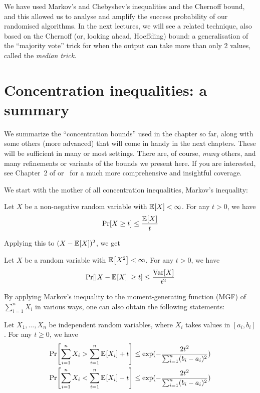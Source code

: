 \begin{framed}
 We have used Markov's and Chebyshev's inequalities and the Chernoff bound, and this allowed us to analyse and amplify the success probability of our randomised algorithms. In the next lectures, we will see a related technique, also based on the Chernoff (or, looking ahead, Hoeffding) bound: a generalisation of the ``majority vote'' trick for when the output can take more than only 2 values, called the \emph{median trick.}
\end{framed}


\section{Concentration inequalities: a summary}
We summarize the ``concentration bounds'' used in the chapter so far, along with some others (more advanced) that will come in handy in the next chapters. These will be sufficient in many or most settings. 
There are, of course, \emph{many} others, and many refinements or variants of the bounds we present here. If you are interested, see \eg Chapter~2 of \cite{Vershynin18} or~\cite{BoucheronLM13} for a much more comprehensive and insightful coverage.

We start with the mother of all concentration inequalities, Markov's inequality:
\begin{theorem}
  \label{theo:markov}
Let $X$ be a non-negative random variable with $\bEE{X} < \infty$. For any $t > 0$, we have
\[  
  \bPr{ X \geq t } \leq \frac{\bEE{X}}{t}
\]
\end{theorem}
\noindent Applying this to $(X-\bEE{X})^2$, we get 
\begin{theorem}
  \label{theo:chebyshev}
Let $X$ be a random variable with $\bEE{X^2} < \infty$. For any $t > 0$, we have
\[  
  \bPr{ \abs{X-\bEE{X}} \geq t } \leq \frac{\var[X]}{t^2}
\]
\end{theorem}
By applying Markov's inequality to the moment-generating function (MGF) of $\sum_{i=1}^n X_i$ in various ways, one can also obtain the following statements:
\begin{theorem}
  \label{theo:hoeffding}
Let $X_1,\dots,X_n$ be independent random variables, where $X_i$ takes values in $[a_i,b_i]$. For any $t \geq 0$, we have
\begin{align}
\bPr{ \sum_{i=1}^n X_i   > \sum_{i=1}^n \bEE{X_i} + t }  
&\leq \exp(-\frac{2 t^2}{\sum_{i=1}^n (b_i-a_i)^2}) \\
\bPr{\sum_{i=1}^n X_i  < \sum_{i=1}^n \bEE{X_i} - t }
 &\leq \exp(-\frac{2 t^2}{\sum_{i=1}^n (b_i-a_i)^2})
 \end{align}
\end{theorem}

